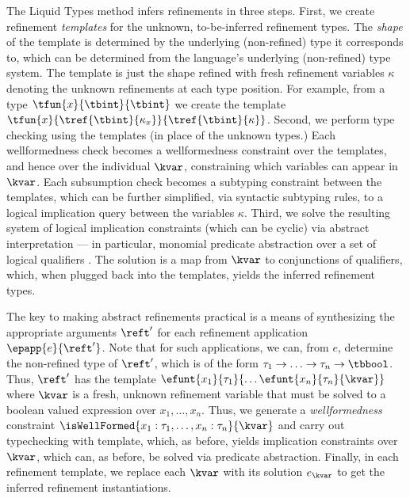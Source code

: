The Liquid Types method infers refinements in three steps. 
%
First, we create refinement \emph{templates} for the unknown, 
to-be-inferred refinement types. The \emph{shape} of the template 
is determined by the underlying (non-refined) type it corresponds to, 
which can be determined from the language's underlying (non-refined) 
type system. 
The template is just the shape refined with fresh refinement variables
$\kappa$ denoting the unknown refinements at each type position. 
For example, from a type ${\tfun{x}{\tbint}{\tbint}}$ we create 
the template ${\tfun{x}{\tref{\tbint}{\kappa_x}}{\tref{\tbint}{\kappa}}}$.
%
Second, we perform type checking using the templates (in place of the
unknown types.) Each wellformedness check becomes a wellformedness
constraint over the templates, and hence over the individual $\kvar$,
constraining which variables can appear in $\kvar$.
Each subsumption check becomes a subtyping constraint
between the templates, which can be further simplified, via syntactic
subtyping rules, to a logical implication query between the variables
$\kappa$.
%
Third, we solve the resulting system of logical implication constraints
(which can be cyclic) via abstract interpretation --- in particular,
monomial predicate abstraction over a set of logical qualifiers
\cite{Houdini,LiquidPLDI08}. The solution is a map from $\kvar$ to
conjunctions of qualifiers, which, when plugged back into the templates,
yields the inferred refinement types.

The key to making abstract refinements practical is a means of 
synthesizing the appropriate arguments $\reft'$ for each refinement 
application $\epapp{e}{\reft'}$. 
Note that for such applications, we can, from $e$, determine the 
non-refined type of $\reft'$, which is of the form 
${\tau_1 \rightarrow \ldots \rightarrow \tau_n \rightarrow \tbbool}$.
Thus, $\reft'$ has the template 
${\efunt{x_1}{\tau_1}{\ldots \efunt{x_n}{\tau_n}{\kvar}}}$
where $\kvar$ is a fresh, unknown refinement variable that 
must be solved to a boolean valued expression over $x_1,\ldots,x_n$.
Thus, we generate a \emph{wellformedness} constraint 
${\isWellFormed{x_1:\tau_1, \ldots, x_n:\tau_n}{\kvar}}$
and carry out typechecking with template, which, as before, yields
implication constraints over $\kvar$, which can, as before, be 
solved via predicate abstraction.
Finally, in each refinement template, we replace each $\kvar$ with its
solution $e_\kvar$ to get the inferred refinement instantiations.

